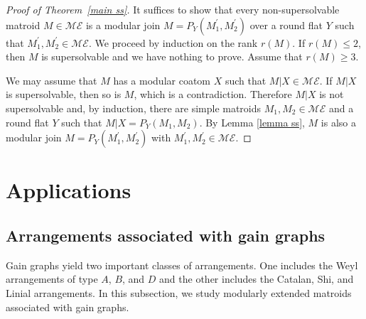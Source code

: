 \documentclass[pdftex]{sigma}
\numberwithin{equation}{section}
\begin{document}
\begin{proof}[Proof of Theorem~\ref{main ss}]
It suffices to show that every non-supersolvable matroid $ M \in \mathcal{ME} $ is a modular join $ M=P_{Y}(M^{\prime}_{1}, M^{\prime}_{2}) $ over a round flat $ Y $ such that $ M^{\prime}_{1},M^{\prime}_{2} \in \mathcal{ME} $.
We proceed by induction on the rank $ r(M) $.
If $ r(M) \leq 2 $, then $ M $ is supersolvable and we have nothing to prove.
Assume that $ r(M) \geq 3 $.

 We may assume that $ M $ has a modular coatom $ X $ such that $ M|X \in \mathcal{ME} $.
If $ M|X $ is super\-solvable, then so is $ M $, which is a contradiction.
Therefore $ M|X $ is not supersolvable and, by induction, there are simple matroids $ M_{1}, M_{2} \in \mathcal{ME} $ and a round flat $ Y $ such that $ M|X = P_{Y}(M_{1}, M_{2}) $.
By Lemma \ref{lemma ss}, $ M $ is also a modular join $ M = P_{Y}(M^{\prime}_{1}, M^{\prime}_{2}) $ with $ M^{\prime}_{1}, M^{\prime}_{2} \in \mathcal{ME} $.
\end{proof}

\section{Applications}\label{sec:applications}

\subsection{Arrangements associated with gain graphs}
Gain graphs yield two important classes of arrangements.
One includes the Weyl arrangements of type $ A$, $B $, and $ D $ and the other includes the Catalan, Shi, and Linial arrangements.
In this subsection, we study modularly extended matroids associated with gain graphs.
\end{document}
